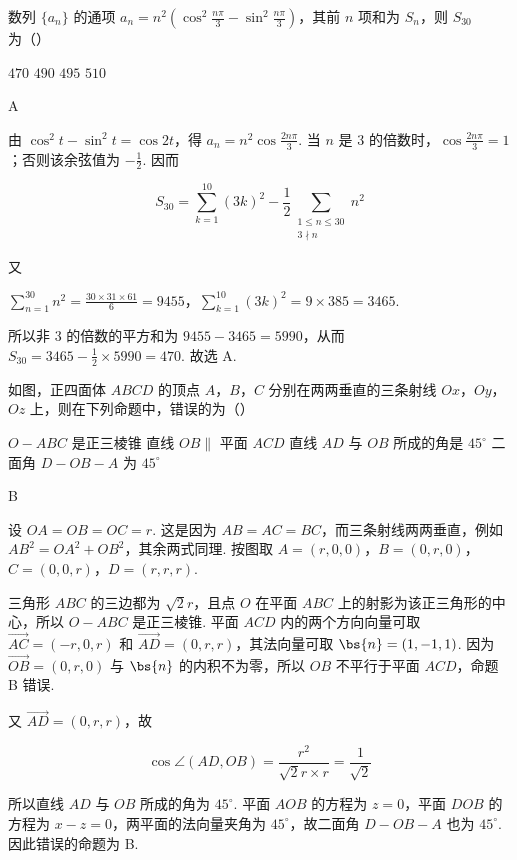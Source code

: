 \begin{problem}
数列 \(\{a_{n}\}\) 的通项 \(a_{n} = n^{2}\left(\cos^{2}\frac{n\pi}{3} - \sin^{2}\frac{n\pi}{3}\right)\)，其前 \(n\) 项和为 \(S_{n}\)，则 \(S_{30}\) 为（\quad）

\choices
    {\(470\)}
    {\(490\)}
    {\(495\)}
    {\(510\)}
\end{problem}

\begin{answer}
A
\end{answer}

\begin{solution}
由 \(\cos^2t-\sin^2t=\cos2t\)，得 \(a_n=n^2\cos\frac{2n\pi}{3}\). 当 \(n\) 是 \(3\) 的倍数时，\(\cos\frac{2n\pi}{3}=1\)；否则该余弦值为 \(-\frac12\). 因而

\[
S_{30}=\sum_{k=1}^{10}(3k)^2-\frac12\sum_{\substack{1\leqslant n\leqslant30\\3\nmid n}}n^2
\]

又

\(\sum_{n=1}^{30}n^2=\frac{30\times31\times61}{6}=9455\)，\(\sum_{k=1}^{10}(3k)^2=9\times385=3465\).

所以非 \(3\) 的倍数的平方和为 \(9455-3465=5990\)，从而 \(S_{30}=3465-\frac12\times5990=470\). 故选 A.
\end{solution}

\begin{problem}
如图，正四面体 \(ABCD\) 的顶点 \(A\)，\(B\)，\(C\) 分别在两两垂直的三条射线 \(Ox\)，\(Oy\)，\(Oz\) 上，则在下列命题中，错误的为（\quad）


\choices
    {\(O - ABC\) 是正三棱锥}
    {直线 \(OB \parallel\) 平面 \(ACD\)}
    {直线 \(AD\) 与 \(OB\) 所成的角是 \(45^{\circ}\)}
    {二面角 \(D - OB - A\) 为 \(45^{\circ}\)}
\end{problem}

\begin{answer}
B
\end{answer}

\begin{solution}
设 \(OA=OB=OC=r\). 这是因为 \(AB=AC=BC\)，而三条射线两两垂直，例如 \(AB^2=OA^2+OB^2\)，其余两式同理. 按图取 \(A=(r,0,0)\)，\(B=(0,r,0)\)，\(C=(0,0,r)\)，\(D=(r,r,r)\).

三角形 \(ABC\) 的三边都为 \(\sqrt2r\)，且点 \(O\) 在平面 \(ABC\) 上的射影为该正三角形的中心，所以 \(O-ABC\) 是正三棱锥. 平面 \(ACD\) 内的两个方向向量可取 \(\overrightarrow{AC}=(-r,0,r)\) 和 \(\overrightarrow{AD}=(0,r,r)\)，其法向量可取 \(\bs{n}=(1,-1,1)\). 因为 \(\overrightarrow{OB}=(0,r,0)\) 与 \(\bs{n}\) 的内积不为零，所以 \(OB\) 不平行于平面 \(ACD\)，命题 B 错误.

又 \(\overrightarrow{AD}=(0,r,r)\)，故

\[
\cos\angle(AD,OB)=\frac{r^2}{\sqrt2r\times r}=\frac1{\sqrt2}
\]

所以直线 \(AD\) 与 \(OB\) 所成的角为 \(45^\circ\). 平面 \(AOB\) 的方程为 \(z=0\)，平面 \(DOB\) 的方程为 \(x-z=0\)，两平面的法向量夹角为 \(45^\circ\)，故二面角 \(D-OB-A\) 也为 \(45^\circ\). 因此错误的命题为 B.
\end{solution}

